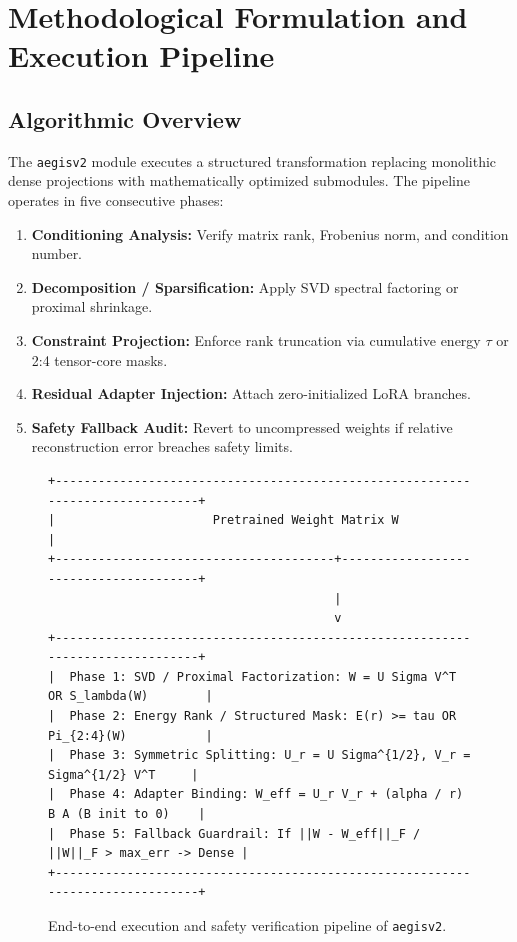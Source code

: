 \section{Methodological Formulation and Execution Pipeline}

\subsection{Algorithmic Overview}
The \texttt{aegisv2} module executes a structured transformation replacing monolithic dense projections with mathematically optimized submodules. The pipeline operates in five consecutive phases:
\begin{enumerate}
\item \textbf{Conditioning Analysis:} Verify matrix rank, Frobenius norm, and condition number.
\item \textbf{Decomposition / Sparsification:} Apply SVD spectral factoring or proximal shrinkage.
\item \textbf{Constraint Projection:} Enforce rank truncation via cumulative energy $\tau$ or 2:4 tensor-core masks.
\item \textbf{Residual Adapter Injection:} Attach zero-initialized LoRA branches.
\item \textbf{Safety Fallback Audit:} Revert to uncompressed weights if relative reconstruction error breaches safety limits.
\end{enumerate}

\begin{figure}[t]
\centering
\begin{verbatim}
+-------------------------------------------------------------------------------+
|                      Pretrained Weight Matrix W                               |
+---------------------------------------+---------------------------------------+
                                        |
                                        v
+-------------------------------------------------------------------------------+
|  Phase 1: SVD / Proximal Factorization: W = U Sigma V^T OR S_lambda(W)        |
|  Phase 2: Energy Rank / Structured Mask: E(r) >= tau OR Pi_{2:4}(W)           |
|  Phase 3: Symmetric Splitting: U_r = U Sigma^{1/2}, V_r = Sigma^{1/2} V^T     |
|  Phase 4: Adapter Binding: W_eff = U_r V_r + (alpha / r) B A (B init to 0)    |
|  Phase 5: Fallback Guardrail: If ||W - W_eff||_F / ||W||_F > max_err -> Dense |
+-------------------------------------------------------------------------------+
\end{verbatim}
\caption{End-to-end execution and safety verification pipeline of \texttt{aegisv2}.}
\end{figure}

